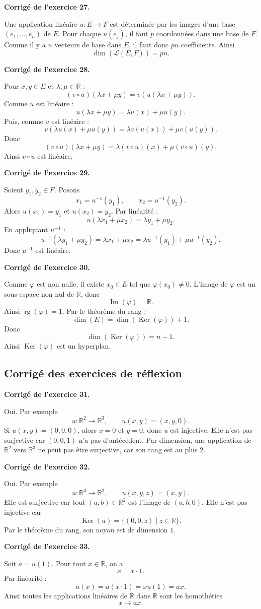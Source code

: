 \documentclass[11pt,a4paper]{article}
\newcommand{\corr}[1]{
    \vspace{0.4cm}
    \noindent\textbf{\textcolor{bleuprepa}{Corrigé de l'exercice #1.}}
    \par\vspace{0.1cm}
}
\newcommand{\R}{\mathbb{R}}
\newcommand{\Ker}{\operatorname{Ker}}
\newcommand{\Img}{\operatorname{Im}}
\newcommand{\rg}{\operatorname{rg}}
\begin{document}
\corr{27}
Une application linéaire $u:E\to F$ est déterminée par les images d'une base $(e_1,\dots,e_n)$ de $E$. Pour chaque $u(e_j)$, il faut $p$ coordonnées dans une base de $F$. Comme il y a $n$ vecteurs de base dans $E$, il faut donc $pn$ coefficients. Ainsi
\[
\dim(\mathcal{L}(E,F))=pn.
\]

\corr{28}
Pour $x,y\in E$ et $\lambda,\mu\in\R$ :
\[
(v\circ u)(\lambda x+\mu y)=v(u(\lambda x+\mu y)).
\]
Comme $u$ est linéaire :
\[
u(\lambda x+\mu y)=\lambda u(x)+\mu u(y).
\]
Puis, comme $v$ est linéaire :
\[
v(\lambda u(x)+\mu u(y))=\lambda v(u(x))+\mu v(u(y)).
\]
Donc
\[
(v\circ u)(\lambda x+\mu y)=\lambda(v\circ u)(x)+\mu(v\circ u)(y).
\]
Ainsi $v\circ u$ est linéaire.

\corr{29}
Soient $y_1,y_2\in F$. Posons
\[
x_1=u^{-1}(y_1),\qquad x_2=u^{-1}(y_2).
\]
Alors $u(x_1)=y_1$ et $u(x_2)=y_2$. Par linéarité :
\[
u(\lambda x_1+\mu x_2)=\lambda y_1+\mu y_2.
\]
En appliquant $u^{-1}$ :
\[
u^{-1}(\lambda y_1+\mu y_2)=\lambda x_1+\mu x_2
=\lambda u^{-1}(y_1)+\mu u^{-1}(y_2).
\]
Donc $u^{-1}$ est linéaire.

\corr{30}
Comme $\varphi$ est non nulle, il existe $x_0\in E$ tel que $\varphi(x_0)\neq 0$. L'image de $\varphi$ est un sous-espace non nul de $\R$, donc
\[
\Img(\varphi)=\R.
\]
Ainsi $\rg(\varphi)=1$. Par le théorème du rang :
\[
\dim(E)=\dim(\Ker(\varphi))+1.
\]
Donc
\[
\dim(\Ker(\varphi))=n-1.
\]
Ainsi $\Ker(\varphi)$ est un hyperplan.

\subsection{Corrigé des exercices de réflexion}

\corr{31}
Oui. Par exemple
\[
u:\R^2\to\R^3,\qquad u(x,y)=(x,y,0).
\]
Si $u(x,y)=(0,0,0)$, alors $x=0$ et $y=0$, donc $u$ est injective. Elle n'est pas surjective car $(0,0,1)$ n'a pas d'antécédent. Par dimension, une application de $\R^2$ vers $\R^3$ ne peut pas être surjective, car son rang est au plus $2$.

\corr{32}
Oui. Par exemple
\[
u:\R^3\to\R^2,\qquad u(x,y,z)=(x,y).
\]
Elle est surjective car tout $(a,b)\in\R^2$ est l'image de $(a,b,0)$. Elle n'est pas injective car
\[
\Ker(u)=\{(0,0,z)\mid z\in\R\}.
\]
Par le théorème du rang, son noyau est de dimension $1$.

\corr{33}
Soit $a=u(1)$. Pour tout $x\in\R$, on a
\[
x=x\cdot 1.
\]
Par linéarité :
\[
u(x)=u(x\cdot 1)=x u(1)=ax.
\]
Ainsi toutes les applications linéaires de $\R$ dans $\R$ sont les homothéties
\[
x\mapsto ax.
\]
\end{document}
